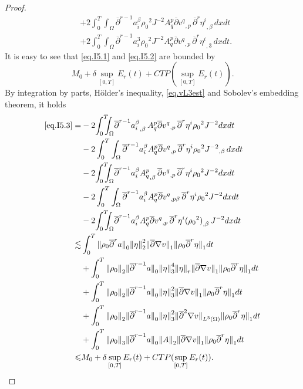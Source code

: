 \documentclass[12pt,twoside,reqno]{amsart}
\numberwithin{equation}{section}
\theoremstyle{definition}
\theoremstyle{remark}
\begin{document}
\begin{proof}
\begin{align}
  &+2{\int_0^T\!\!\!\!\int_\Omega }  {\overline{\partial}}^{r-1} a_i^\beta {\rho_0}^2  J^{-2}A^p_q{{{{\overline{\partial}} v^q}}_{,{p}}\,}{\overline{\partial}}^r{{{\eta^i}}_{,{\beta}}\,}dxdt\label{eq.I5.3}\\
  &+2{\int_0^T\!\!\!\!\int_\Omega }  {\overline{\partial}}^{r-1} a_i^3 {\rho_0}^2  J^{-2}A^p_q{{{{\overline{\partial}} v^q}}_{,{p}}\,}{\overline{\partial}}^r{{{\eta^i}}_{,{3}}\,}dxdt.\label{eq.I5.4}
\end{align}
It is easy to see that \eqref{eq.I5.1} and \eqref{eq.I5.2} are bounded by $$M_0+\delta\sup_{[0,T]}E_r(t)+CTP(\sup_{[0,T]}E_r(t)).$$
By integration by parts, H\"older's inequality, \eqref{eq.vL3est} and Sobolev's embedding theorem, it holds
\begin{align*}
  \eqref{eq.I5.3}=&-2{\int_0^T\!\!\!\!\int_\Omega } {{{{\overline{\partial}}^{r-1} a^\beta_i}}_{,{\beta}}\,} A^p_{q}{\overline{\partial}}{{{v^q}}_{,{p}}\,}{\overline{\partial}}^r\eta^i{\rho_0}^2  J^{-2} dx dt\\
  &-2\int_0^T \int_\Omega{\overline{\partial}}^{r-1} a^\beta_i A^p_{q}{\overline{\partial}}{{{v^q}}_{,{p}}\,} {\overline{\partial}}^r\eta^i{\rho_0}^2 {{{J^{-2}}}_{,{\beta}}\,}dxdt\\
  &-2{\int_0^T\!\!\!\!\int_\Omega } {\overline{\partial}}^{r-1} a^\beta_i {{{A^p_{q}}}_{,{\beta}}\,}{\overline{\partial}}{{{v^q}}_{,{p}}\,} {\overline{\partial}}^r\eta^i{\rho_0}^2  J^{-2}dx dt\\
  &-2\int_0^T \int_\Omega{\overline{\partial}}^{r-1} a^\beta_i A^p_{q}{\overline{\partial}}{{{v^q}}_{,{p\beta}}\,} {\overline{\partial}}^r\eta^i{\rho_0}^2  J^{-2}dx dt\\
  &-2{\int_0^T\!\!\!\!\int_\Omega } {\overline{\partial}}^{r-1} a^\beta_i A^p_{q}{\overline{\partial}}{{{v^q}}_{,{p}}\,} {\overline{\partial}}^r\eta^i{{{({\rho_0}^2)}}_{,{\beta}}\,}J^{-2}dx dt\\
  \lesssim& \int_0^T{\Vert{{\rho_0} {\overline{\partial}}^r a}\Vert}_0{\Vert{\eta}\Vert}_2^2{\Vert{{\overline{\partial}}{\nabla} v}\Vert}_1{\Vert{{\rho_0} {\overline{\partial}}^r\eta}\Vert}_1dt\\
  &+\int_0^T{\Vert{\rho_0}\Vert}_2{\Vert{{\overline{\partial}}^{r-1} a}\Vert}_0{\Vert{\eta}\Vert}_3^4{\Vert{\eta}\Vert}_r{\Vert{{\overline{\partial}}{\nabla} v}\Vert}_1{\Vert{{\rho_0} {\overline{\partial}}^r\eta}\Vert}_1dt\\
  &+\int_0^T{\Vert{\rho_0}\Vert}_2{\Vert{{\overline{\partial}}^{r-1} a}\Vert}_0{\Vert{\eta}\Vert}_3^2{\Vert{{\overline{\partial}}{\nabla} v}\Vert}_1{\Vert{{\rho_0} {\overline{\partial}}^r\eta}\Vert}_1dt\\
  &+\int_0^T{\Vert{\rho_0}\Vert}_2{\Vert{{\overline{\partial}}^{r-1} a}\Vert}_0{\Vert{\eta}\Vert}_3^2{\Vert{{\overline{\partial}}^2{\nabla} v}\Vert}_{L^3(\Omega)}{\Vert{{\rho_0} {\overline{\partial}}^r\eta}\Vert}_1dt\\
  &+ \int_0^T{\Vert{\rho_0}\Vert}_3{\Vert{{\overline{\partial}}^{r-1} a}\Vert}_0{\Vert{A}\Vert}_2{\Vert{{\overline{\partial}}{\nabla} v}\Vert}_1{\Vert{{\rho_0} {\overline{\partial}}^r\eta}\Vert}_1dt\\
  {\leqslant} &M_0+\delta\sup_{[0,T]}E_r(t)+CTP(\sup_{[0,T]}E_r(t)).
\end{align*}


\end{proof}
\end{document}
